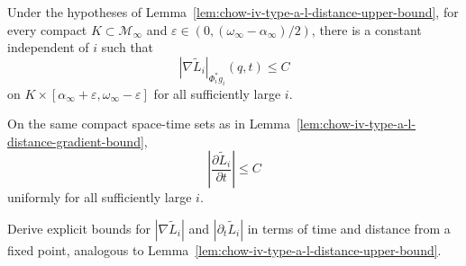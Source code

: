 \begin{lemma}
\label{lem:chow-iv-type-a-l-distance-gradient-bound}
Under the hypotheses of Lemma~\ref{lem:chow-iv-type-a-l-distance-upper-bound},
for every compact \(K\subset\mathcal M_\infty\) and
\(\varepsilon\in(0,(\omega_\infty-\alpha_\infty)/2)\), there is a constant
independent of \(i\) such that
\[
 |\nabla\widetilde L_i|_{\Phi_i^*g_i}(q,t)\leq C
\]
on \(K\times[\alpha_\infty+\varepsilon,
\omega_\infty-\varepsilon]\) for all sufficiently large \(i\).
\end{lemma}

\begin{lemma}
\label{lem:chow-iv-type-a-l-distance-time-bound}
On the same compact space-time sets as in
Lemma~\ref{lem:chow-iv-type-a-l-distance-gradient-bound},
\[
 \left|\frac{\partial\widetilde L_i}{\partial t}\right|\leq C
\]
uniformly for all sufficiently large \(i\).
\end{lemma}

\begin{example}
\label{ex:chow-iv-explicit-l-distance-derivative-bounds}
Derive explicit bounds for \(|\nabla\widetilde L_i|\) and
\(|\partial_t\widetilde L_i|\) in terms of time and distance from a fixed
point, analogous to Lemma~\ref{lem:chow-iv-type-a-l-distance-upper-bound}.
\end{example}

